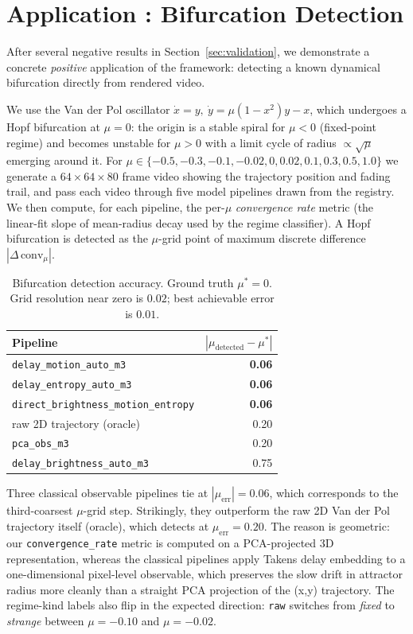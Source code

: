 \documentclass[11pt,a4paper]{article}
\begin{document}
\section{Application : Bifurcation Detection}
\label{sec:bifurcation}

After several negative results in Section~\ref{sec:validation}, we
demonstrate a concrete \emph{positive} application of the framework:
detecting a known dynamical bifurcation directly from rendered video.

We use the Van der Pol oscillator
$\dot x = y,\ \dot y = \mu(1-x^2)y - x$, which undergoes a Hopf
bifurcation at $\mu = 0$: the origin is a stable spiral for $\mu<0$
(fixed-point regime) and becomes unstable for $\mu>0$ with a limit
cycle of radius $\propto \sqrt{\mu}$ emerging around it. For
$\mu \in \{-0.5,-0.3,-0.1,-0.02,0,0.02,0.1,0.3,0.5,1.0\}$ we
generate a $64\times64\times80$ frame video showing the trajectory
position and fading trail, and pass each video through five model
pipelines drawn from the registry. We then compute, for each
pipeline, the per-$\mu$ \emph{convergence rate} metric (the
linear-fit slope of mean-radius decay used by the regime classifier).
A Hopf bifurcation is detected as the $\mu$-grid point of maximum
discrete difference $|\Delta\,\mathrm{conv}_\mu|$.

\begin{table}[h]
\centering
\caption{Bifurcation detection accuracy. Ground truth $\mu^* = 0$.
Grid resolution near zero is $0.02$; best achievable error is $0.01$.}
\label{tab:bifurcation}
\begin{tabular}{lr}
\toprule
Pipeline & $|\mu_{\text{detected}} - \mu^*|$ \\
\midrule
\texttt{delay\_motion\_auto\_m3} & \textbf{0.06} \\
\texttt{delay\_entropy\_auto\_m3} & \textbf{0.06} \\
\texttt{direct\_brightness\_motion\_entropy} & \textbf{0.06} \\
raw 2D trajectory (oracle) & 0.20 \\
\texttt{pca\_obs\_m3} & 0.20 \\
\texttt{delay\_brightness\_auto\_m3} & 0.75 \\
\bottomrule
\end{tabular}
\end{table}

Three classical observable pipelines tie at $|\mu_{\text{err}}|=0.06$,
which corresponds to the third-coarsest $\mu$-grid step. Strikingly,
they outperform the raw 2D Van der Pol trajectory itself (oracle),
which detects at $\mu_{\text{err}}=0.20$. The reason is geometric: our
\texttt{convergence\_rate} metric is computed on a PCA-projected 3D
representation, whereas the classical pipelines apply Takens delay
embedding to a one-dimensional pixel-level observable, which
preserves the slow drift in attractor radius more cleanly than a
straight PCA projection of the (x,y) trajectory. The regime-kind
labels also flip in the expected direction:
\texttt{raw} switches from \emph{fixed} to \emph{strange} between
$\mu=-0.10$ and $\mu=-0.02$.
\end{document}
